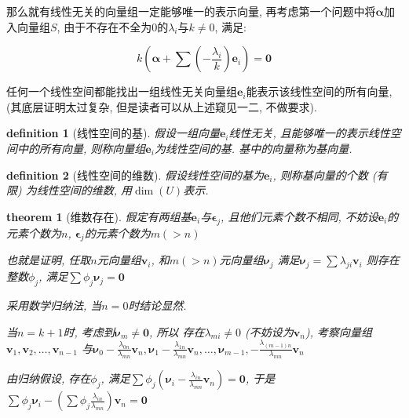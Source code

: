 \documentclass[12pt]{ctexbook}
\newtheorem{definition}{definition}
\numberwithin{definition}{section}
\newtheorem{theorem}{theorem}
\numberwithin{theorem}{section}
\numberwithin{exercise}{section}
\numberwithin{example}{section}
\numberwithin{lemma}{section}
\begin{document}
    那么就有线性无关的向量组一定能够唯一的表示向量, 再考虑第一个问题中将\(\boldsymbol{\alpha}\)加入向量组\(S\),
    由于不存在不全为0的\(\lambda_i\)与\(k \neq 0\), 满足:

    \begin{equation}
        k (\boldsymbol{\alpha} + \sum (-\frac{\lambda_i}{k}) \boldsymbol{e}_i) = \boldsymbol{0}
    \end{equation}

    任何一个线性空间都能找出一组线性无关向量组\(\boldsymbol{e}_i\)能表示该线性空间的所有向量, 
    (其底层证明太过复杂, 但是读者可以从上述窥见一二, 不做要求).

    \begin{definition}
        [线性空间的基] 假设一组向量\(\boldsymbol{e}_i\)线性无关, 且能够唯一的表示线性空间中的所有向量, 则称向量组\(\boldsymbol{e}_i\)为线性空间的基.
        基中的向量称为基向量.
    \end{definition}

    \begin{definition}
        [线性空间的维数] 假设线性空间的基为\(\boldsymbol{e}_i\), 则称基向量的个数 (有限) 为线性空间的维数, 用\(\dim {(U)}\)表示.
    \end{definition}

    \begin{theorem}
        [维数存在] 假定有两组基\(\boldsymbol{e}_i\)与\(\boldsymbol{\epsilon}_j\), 
        且他们元素个数不相同, 不妨设\(\boldsymbol{e}_i\)的元素个数为\(n\), \(\boldsymbol{\epsilon}_j\)的元素个数为\(m (> n)\)

        也就是证明, 任取\(n\)元向量组\(\boldsymbol{v}_i\), 和\(m (> n)\)元向量组\(\boldsymbol{\nu}_j\)
        满足\(\boldsymbol{\nu}_j = \sum \lambda_{ji}  \boldsymbol{v}_i\)
        则存在整数\(\phi_j\), 满足\(\sum \phi_j \boldsymbol{\nu}_j = \boldsymbol{0}\)

        采用数学归纳法, 当\(n = 0\)时结论显然.

        当\(n = k + 1\)时, 考虑到\(\boldsymbol{\nu}_{m} \neq \boldsymbol{0}\), 所以
        存在\(\lambda_{mi} \neq 0\) (不妨设为\(\boldsymbol{v}_n\)), 考察向量组\(\boldsymbol{v}_1, \boldsymbol{v}_2, \ldots , \boldsymbol{v}_{n-1}\)
        与\(\boldsymbol{\nu}_0 - \frac{\lambda_{0n}}{\lambda_{mn}} \boldsymbol{v}_n, \boldsymbol{\nu}_1 - \frac{\lambda_{1n}}{\lambda_{mn}} \boldsymbol{v}_n, \ldots, \boldsymbol{\nu}_{m-1}, - \frac{\lambda_{(m-1)n}}{\lambda_{mn}} \boldsymbol{v}_n\)
        
        由归纳假设, 存在\(\phi_j\), 满足\(\sum \phi_j(\boldsymbol{\nu}_i - \frac{\lambda_{in}}{\lambda_{mn}} \boldsymbol{v}_n) = \boldsymbol{0}\), 于是\(\sum \phi_j\boldsymbol{\nu}_i - (\sum \phi_j\frac{\lambda_{in}}{\lambda_{mn}}) \boldsymbol{v}_n = \boldsymbol{0}\)
    \end{theorem}
\end{document}
